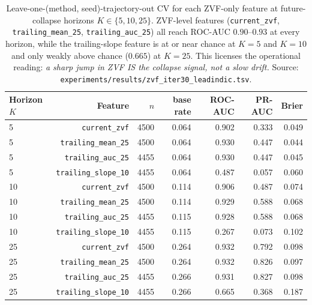 \begin{table}[htbp]
\centering
\small
\setlength{\tabcolsep}{4pt}
\begin{tabular}{lrrrrrr}
\hline
Horizon $K$ & Feature & $n$ & base rate & ROC-AUC & PR-AUC & Brier \\
\hline
5  & \texttt{current\_zvf}        & 4500 & 0.064 & 0.902 & 0.333 & 0.049 \\
5  & \texttt{trailing\_mean\_25}  & 4500 & 0.064 & 0.930 & 0.447 & 0.044 \\
5  & \texttt{trailing\_auc\_25}   & 4455 & 0.064 & 0.930 & 0.447 & 0.045 \\
5  & \texttt{trailing\_slope\_10} & 4455 & 0.064 & 0.487 & 0.057 & 0.060 \\
10 & \texttt{current\_zvf}        & 4500 & 0.114 & 0.906 & 0.487 & 0.074 \\
10 & \texttt{trailing\_mean\_25}  & 4500 & 0.114 & 0.929 & 0.588 & 0.068 \\
10 & \texttt{trailing\_auc\_25}   & 4455 & 0.115 & 0.928 & 0.588 & 0.068 \\
10 & \texttt{trailing\_slope\_10} & 4455 & 0.115 & 0.267 & 0.073 & 0.102 \\
25 & \texttt{current\_zvf}        & 4500 & 0.264 & 0.932 & 0.792 & 0.098 \\
25 & \texttt{trailing\_mean\_25}  & 4500 & 0.264 & 0.932 & 0.826 & 0.097 \\
25 & \texttt{trailing\_auc\_25}   & 4455 & 0.266 & 0.931 & 0.827 & 0.098 \\
25 & \texttt{trailing\_slope\_10} & 4455 & 0.266 & 0.665 & 0.368 & 0.187 \\
\hline
\end{tabular}
\caption{Leave-one-(method, seed)-trajectory-out CV for each ZVF-only feature
at future-collapse horizons $K \in \{5, 10, 25\}$. ZVF-level features
(\texttt{current\_zvf}, \texttt{trailing\_mean\_25}, \texttt{trailing\_auc\_25})
all reach ROC-AUC $0.90$–$0.93$ at every horizon, while the trailing-slope
feature is at or near chance at $K{=}5$ and $K{=}10$ and only weakly above
chance ($0.665$) at $K{=}25$. This licenses the operational reading:
\emph{a sharp jump in ZVF IS the collapse signal, not a slow drift.}
Source: \texttt{experiments/results/zvf\_iter30\_leadindic.tsv}.}
\label{tab:zvf-iter30-leadindic}
\end{table}

